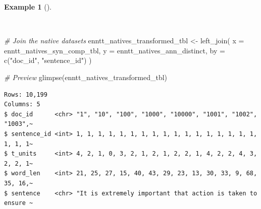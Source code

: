\documentclass[
  letterpaper,
  krantz1]{latex/krantz-mod}
\newenvironment{Shaded}{\begin{snugshade}}{\end{snugshade}}
\newcommand{\AttributeTok}[1]{\textcolor[rgb]{0.00,0.00,0.00}{#1}}
\newcommand{\CommentTok}[1]{\textcolor[rgb]{0.00,0.00,0.00}{\textit{#1}}}
\newcommand{\FunctionTok}[1]{\textcolor[rgb]{0.00,0.00,0.00}{#1}}
\newcommand{\NormalTok}[1]{\textcolor[rgb]{0.00,0.00,0.00}{#1}}
\newcommand{\OtherTok}[1]{\textcolor[rgb]{0.00,0.00,0.00}{#1}}
\newcommand{\StringTok}[1]{\textcolor[rgb]{0.00,0.00,0.00}{#1}}
\theoremstyle{definition}
\theoremstyle{definition}
\newtheorem{example}{Example}[chapter]
\theoremstyle{remark}
\begin{document}
\begin{example}[]\protect\hypertarget{exm-transform-merging-join-left-syn-comp-natives}{}\label{exm-transform-merging-join-left-syn-comp-natives}

~

\begin{Shaded}
\begin{Highlighting}[numbers=left,,]
\CommentTok{\# Join the native datasets}
\NormalTok{enntt\_natives\_transformed\_tbl }\OtherTok{\textless{}{-}}
  \FunctionTok{left\_join}\NormalTok{(}
    \AttributeTok{x =}\NormalTok{ enntt\_natives\_syn\_comp\_tbl,}
    \AttributeTok{y =}\NormalTok{ enntt\_natives\_ann\_distinct,}
    \AttributeTok{by =} \FunctionTok{c}\NormalTok{(}\StringTok{"doc\_id"}\NormalTok{, }\StringTok{"sentence\_id"}\NormalTok{)}
\NormalTok{  )}

\CommentTok{\# Preview}
\FunctionTok{glimpse}\NormalTok{(enntt\_natives\_transformed\_tbl)}
\end{Highlighting}
\end{Shaded}

\begin{verbatim}
Rows: 10,199
Columns: 5
$ doc_id      <chr> "1", "10", "100", "1000", "10000", "1001", "1002", "1003",~
$ sentence_id <int> 1, 1, 1, 1, 1, 1, 1, 1, 1, 1, 1, 1, 1, 1, 1, 1, 1, 1, 1, 1~
$ t_units     <int> 4, 2, 1, 0, 3, 2, 1, 2, 1, 2, 2, 1, 4, 2, 2, 4, 3, 2, 2, 1~
$ word_len    <int> 21, 25, 27, 15, 40, 43, 29, 23, 13, 30, 33, 9, 68, 35, 16,~
$ sentence    <chr> "It is extremely important that action is taken to ensure ~
\end{verbatim}

\end{example}

\pagebreak
\end{document}
